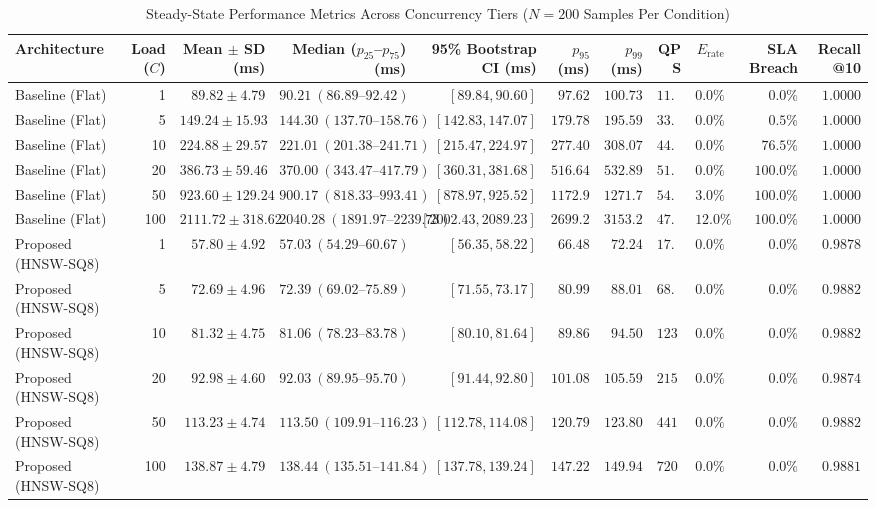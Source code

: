 \documentclass[conference]{IEEEtran}
\begin{document}
\begin{table}[t]
\caption{Steady-State Performance Metrics Across Concurrency Tiers ($N=200$ Samples Per Condition)}
\label{tab:results_summary}
\centering
\footnotesize
\setlength{\tabcolsep}{3.8pt}
\begin{tabular}{lrrrrrrrrrr}
\toprule
Architecture & Load ($C$) & Mean $\pm$ SD (ms) & Median ($p_{25}$--$p_{75}$) (ms) & 95\% Bootstrap CI (ms) & $p_{95}$ (ms) & $p_{99}$ (ms) & QPS & $E_{\text{rate}}$ & SLA Breach & Recall@10 \\
\midrule
Baseline (Flat) & 1 & $89.82 \pm 4.79$ & $90.21\ (86.89\text{--}92.42)$ & $[89.84, 90.60]$ & $97.62$ & $100.73$ & $11.1$ & $0.0\%$ & $0.0\%$ & $1.0000$ \\
Baseline (Flat) & 5 & $149.24 \pm 15.93$ & $144.30\ (137.70\text{--}158.76)$ & $[142.83, 147.07]$ & $179.78$ & $195.59$ & $33.5$ & $0.0\%$ & $0.5\%$ & $1.0000$ \\
Baseline (Flat) & 10 & $224.88 \pm 29.57$ & $221.01\ (201.38\text{--}241.71)$ & $[215.47, 224.97]$ & $277.40$ & $308.07$ & $44.5$ & $0.0\%$ & $76.5\%$ & $1.0000$ \\
Baseline (Flat) & 20 & $386.73 \pm 59.46$ & $370.00\ (343.47\text{--}417.79)$ & $[360.31, 381.68]$ & $516.64$ & $532.89$ & $51.7$ & $0.0\%$ & $100.0\%$ & $1.0000$ \\
Baseline (Flat) & 50 & $923.60 \pm 129.24$ & $900.17\ (818.33\text{--}993.41)$ & $[878.97, 925.52]$ & $1172.96$ & $1271.73$ & $54.1$ & $3.0\%$ & $100.0\%$ & $1.0000$ \\
Baseline (Flat) & 100 & $2111.72 \pm 318.62$ & $2040.28\ (1891.97\text{--}2239.73)$ & $[2002.43, 2089.23]$ & $2699.22$ & $3153.25$ & $47.4$ & $12.0\%$ & $100.0\%$ & $1.0000$ \\
\midrule
Proposed (HNSW-SQ8) & 1 & $57.80 \pm 4.92$ & $57.03\ (54.29\text{--}60.67)$ & $[56.35, 58.22]$ & $66.48$ & $72.24$ & $17.3$ & $0.0\%$ & $0.0\%$ & $0.9878$ \\
Proposed (HNSW-SQ8) & 5 & $72.69 \pm 4.96$ & $72.39\ (69.02\text{--}75.89)$ & $[71.55, 73.17]$ & $80.99$ & $88.01$ & $68.8$ & $0.0\%$ & $0.0\%$ & $0.9882$ \\
Proposed (HNSW-SQ8) & 10 & $81.32 \pm 4.75$ & $81.06\ (78.23\text{--}83.78)$ & $[80.10, 81.64]$ & $89.86$ & $94.50$ & $123.0$ & $0.0\%$ & $0.0\%$ & $0.9882$ \\
Proposed (HNSW-SQ8) & 20 & $92.98 \pm 4.60$ & $92.03\ (89.95\text{--}95.70)$ & $[91.44, 92.80]$ & $101.08$ & $105.59$ & $215.1$ & $0.0\%$ & $0.0\%$ & $0.9874$ \\
Proposed (HNSW-SQ8) & 50 & $113.23 \pm 4.74$ & $113.50\ (109.91\text{--}116.23)$ & $[112.78, 114.08]$ & $120.79$ & $123.80$ & $441.6$ & $0.0\%$ & $0.0\%$ & $0.9882$ \\
Proposed (HNSW-SQ8) & 100 & $138.87 \pm 4.79$ & $138.44\ (135.51\text{--}141.84)$ & $[137.78, 139.24]$ & $147.22$ & $149.94$ & $720.1$ & $0.0\%$ & $0.0\%$ & $0.9881$ \\
\bottomrule
\end{tabular}
\vspace{-2mm}
\end{table}
\end{document}

